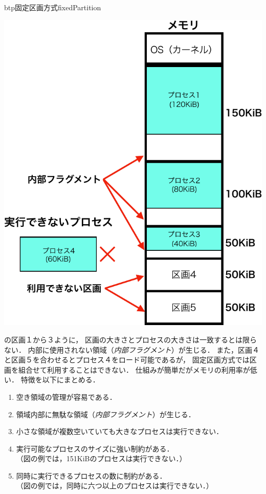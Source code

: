 \begin{myfig}{btp}{固定区画方式}{fixedPartition}
\begin{minipage}{0.49\columnwidth}
\begin{center}
      \includegraphics[scale=0.6]{Fig/fixedPartitionExec-crop.pdf}
      \label{fig:fixedPartitionB}
    \end{center}
  \end{minipage}
\end{myfig}

の区画１から３ように，
区画の大きさとプロセスの大きさは一致するとは限らない．
内部に使用されない領域（\emph{内部フラグメント}）が生じる．
また，区画４と区画５を合わせるとプロセス４をロード可能であるが，
固定区画方式では区画を組合せて利用することはできない．
仕組みが簡単だがメモリの利用率が低い．
特徴を以下にまとめる．

\begin{enumerate}
\item 空き領域の管理が容易である．
\item 領域内部に無駄な領域（\emph{内部フラグメント}）が生じる．
\item 小さな領域が複数空いていても大きなプロセスは実行できない．
\item 実行可能なプロセスのサイズに強い制約がある．\\
  （図の例では，151KiBのプロセスは実行できない．）
\item 同時に実行できるプロセスの数に制約がある．\\
  （図の例では，同時に六つ以上のプロセスは実行できない．）
\end{enumerate}

